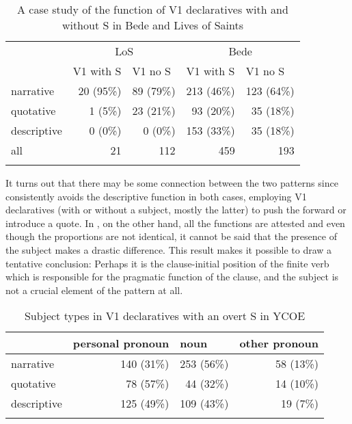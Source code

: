 \documentclass[output=paper,colorlinks,citecolor=brown]{langscibook}
\begin{document}
\begin{table}
\begin{tabularx}{0.8\textwidth}{Xrrrr}
\lsptoprule
& \multicolumn{2}{c}{{LoS}} & \multicolumn{2}{c}{{Bede}}\\
& \multicolumn{1}{l}{V1 with S} & \multicolumn{1}{l}{V1 no S} & \multicolumn{1}{l}{V1 with S} & \multicolumn{1}{l}{V1 no S}\\
\midrule
{narrative} & {20 (95\%)} & {89 (79\%)} & {213 (46\%)} & {123 (64\%)}\\
{quotative} & {1 (5\%)} & {23 (21\%)} & {93 (20\%)} & {35 (18\%)}\\
{descriptive} & {0 (0\%)} & {0 (0\%)} & {153 (33\%)} & {35 (18\%)}\\
{all} & {21} & {112} & {459} & {193}\\
\lspbottomrule
\end{tabularx}
\caption{A case study of the function of V1 declaratives with and without S in Bede and Lives of Saints}
\label{tab:cichosz:6}
\end{table}

It turns out that there may be some connection between the two patterns since  consistently avoids the descriptive function in both cases, employing V1 declaratives (with or without a subject, mostly the latter) to push the  forward or introduce a quote. In , on the other hand, all the functions are attested and even though the proportions are not identical, it cannot be said that the presence of the subject makes a drastic difference. This result makes it possible to draw a tentative conclusion: Perhaps it is the clause-initial position of the finite verb which is responsible for the pragmatic function of the clause, and the subject is not a crucial element of the pattern at all. 

\begin{table}[t]
\begin{tabularx}{0.8\textwidth}{Xrrr}
\lsptoprule
& \multicolumn{1}{l}{personal pronoun} & \multicolumn{1}{l}{noun} & \multicolumn{1}{l}{other pronoun} \\
\midrule
narrative & 140 (31\%) & 253 (56\%) & 58 (13\%)\\
quotative & 78 (57\%) & 44 (32\%) &  14 (10\%)\\
descriptive & 125 (49\%) & 109 (43\%) & 19 (7\%)\\
\lspbottomrule
\end{tabularx}
\caption{Subject types in V1 declaratives with an overt S in YCOE}
\label{tab:cichosz:7}
\end{table}
\end{document}

